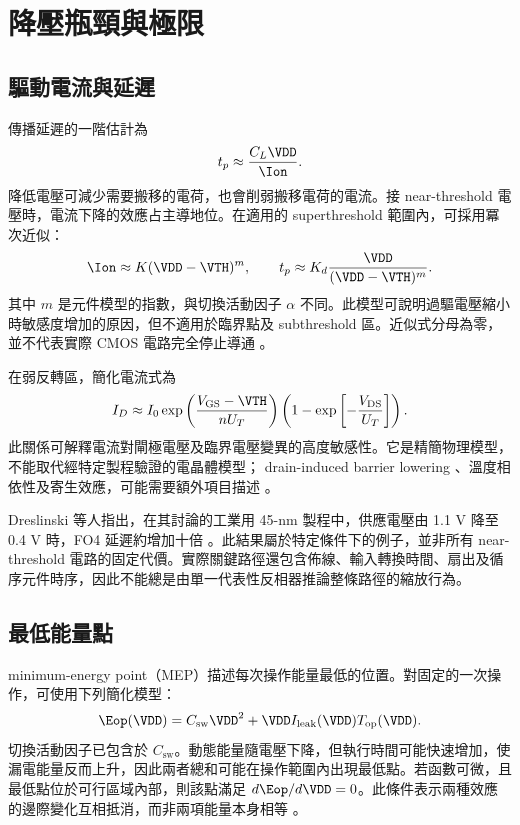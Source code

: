 \chapter{降壓瓶頸與極限}
\label{ch:limits}
\section{驅動電流與延遲}
傳播延遲的一階估計為
\begin{equation}
t_p\approx\frac{C_L\VDD}{\Ion}.
\label{eq:delay}
\end{equation}
降低電壓可減少需要搬移的電荷，也會削弱搬移電荷的電流。接 near-threshold 電壓時，電流下降的效應占主導地位。在適用的 superthreshold 範圍內，可採用冪次近似：
\begin{equation}
\Ion\approx K(\VDD-\VTH)^m,\qquad
t_p\approx K_d\frac{\VDD}{(\VDD-\VTH)^m}.
\label{eq:alphapower}
\end{equation}
其中 $m$ 是元件模型的指數，與切換活動因子 $\alpha$ 不同。此模型可說明過驅電壓縮小時敏感度增加的原因，但不適用於臨界點及 subthreshold 區。近似式分母為零，並不代表實際 CMOS 電路完全停止導通 \cite{gonzalez1997}。

在弱反轉區，簡化電流式為
\begin{equation}
I_D\approx I_0\exp\left(\frac{V_{\mathrm{GS}}-\VTH}{nU_T}\right)
\left(1-\exp\left[-\frac{V_{\mathrm{DS}}}{U_T}\right]\right).
\label{eq:subthreshold}
\end{equation}
此關係可解釋電流對閘極電壓及臨界電壓變異的高度敏感性。它是精簡物理模型，不能取代經特定製程驗證的電晶體模型； drain-induced barrier lowering 、溫度相依性及寄生效應，可能需要額外項目描述 \cite{calhoun2005,markovic2010}。

Dreslinski 等人指出，在其討論的工業用 45-nm 製程中，供應電壓由 1.1 V 降至 0.4 V 時，FO4 延遲約增加十倍 \cite[Sec.~IV-A]{dreslinski2010}。此結果屬於特定條件下的例子，並非所有 near-threshold 電路的固定代價。實際關鍵路徑還包含佈線、輸入轉換時間、扇出及循序元件時序，因此不能總是由單一代表性反相器推論整條路徑的縮放行為。

\section{最低能量點}
 minimum-energy point（MEP）描述每次操作能量最低的位置。對固定的一次操作，可使用下列簡化模型：
\begin{equation}
\Eop(\VDD)=C_{\mathrm{sw}}\VDD^2+
\VDD I_{\mathrm{leak}}(\VDD)T_{\mathrm{op}}(\VDD).
\label{eq:mep}
\end{equation}
切換活動因子已包含於 $C_{\mathrm{sw}}$。動態能量隨電壓下降，但執行時間可能快速增加，使漏電能量反而上升，因此兩者總和可能在操作範圍內出現最低點。若函數可微，且最低點位於可行區域內部，則該點滿足 $d\Eop/d\VDD=0$。此條件表示兩種效應的邊際變化互相抵消，而非兩項能量本身相等 \cite{calhoun2005}。

